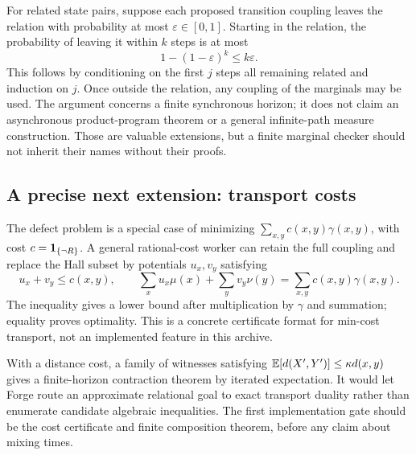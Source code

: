 For related state pairs, suppose each proposed transition coupling leaves the
relation with probability at most $\varepsilon\in[0,1]$. Starting in the
relation, the probability of leaving it within $k$ steps is at most
\[
 1-(1-\varepsilon)^k\le k\varepsilon.
\]
This follows by conditioning on the first $j$ steps all remaining related and
induction on $j$. Once outside the relation, any coupling of the marginals may
be used. The argument concerns a finite synchronous horizon; it does not claim
an asynchronous product-program theorem or a general infinite-path measure
construction. Those are valuable extensions, but a finite marginal checker
should not inherit their names without their proofs.

\subsection{A precise next extension: transport costs}

The defect problem is a special case of minimizing
$\sum_{x,y}c(x,y)\gamma(x,y)$, with cost $c=\mathbf{1}_{\{\neg R\}}$. A general
rational-cost worker can retain the full coupling and replace the Hall subset
by potentials $u_x,v_y$ satisfying
\[
 u_x+v_y\le c(x,y),\qquad
 \sum_xu_x\mu(x)+\sum_yv_y\nu(y)
   =\sum_{x,y}c(x,y)\gamma(x,y).
\]
The inequality gives a lower bound after multiplication by $\gamma$ and
summation; equality proves optimality. This is a concrete certificate format
for min-cost transport, not an implemented feature in this archive.

With a distance cost, a family of witnesses satisfying
$\mathbb{E}[d(X',Y')]\le\kappa d(x,y)$ gives a finite-horizon contraction theorem by
iterated expectation. It would let Forge route an approximate relational goal
to exact transport duality rather than enumerate candidate algebraic
inequalities. The first implementation gate should be the cost certificate
and finite composition theorem, before any claim about mixing times.
